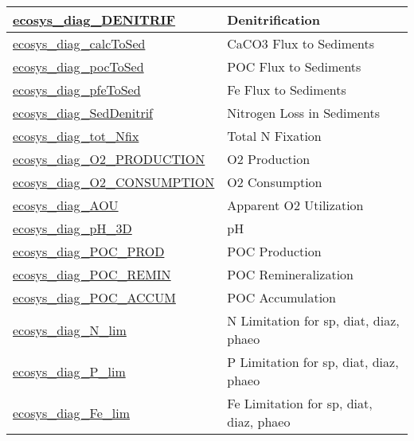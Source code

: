 {\begin{center}
\begin{longtable}{| p{2.0in} | p{4.0in} |}
    \hline
    \hyperref[subsec:var_sec_forcing_ecosys_diag_DENITRIF]{ecosys\_diag\_DENITRIF} & Denitrification \\
    \hline
    \hyperref[subsec:var_sec_forcing_ecosys_diag_calcToSed]{ecosys\_diag\_calcToSed} & CaCO3 Flux to Sediments \\
    \hline
    \hyperref[subsec:var_sec_forcing_ecosys_diag_pocToSed]{ecosys\_diag\_pocToSed} & POC Flux to Sediments \\
    \hline
    \hyperref[subsec:var_sec_forcing_ecosys_diag_pfeToSed]{ecosys\_diag\_pfeToSed} & Fe Flux to Sediments \\
    \hline
    \hyperref[subsec:var_sec_forcing_ecosys_diag_SedDenitrif]{ecosys\_diag\_SedDenitrif} & Nitrogen Loss in Sediments \\
    \hline
    \hyperref[subsec:var_sec_forcing_ecosys_diag_tot_Nfix]{ecosys\_diag\_tot\_Nfix} & Total N Fixation \\
    \hline
    \hyperref[subsec:var_sec_forcing_ecosys_diag_O2_PRODUCTION]{ecosys\_diag\_O2\_\-PRODUCTION} & O2 Production \\
    \hline
    \hyperref[subsec:var_sec_forcing_ecosys_diag_O2_CONSUMPTION]{ecosys\_diag\_O2\_\-CONSUMPTION} & O2 Consumption \\
    \hline
    \hyperref[subsec:var_sec_forcing_ecosys_diag_AOU]{ecosys\_diag\_AOU} & Apparent O2 Utilization \\
    \hline
    \hyperref[subsec:var_sec_forcing_ecosys_diag_pH_3D]{ecosys\_diag\_pH\_3D} & pH \\
    \hline
    \hyperref[subsec:var_sec_forcing_ecosys_diag_POC_PROD]{ecosys\_diag\_POC\_PROD} & POC Production \\
    \hline
    \hyperref[subsec:var_sec_forcing_ecosys_diag_POC_REMIN]{ecosys\_diag\_POC\_REMIN} & POC Remineralization \\
    \hline
    \hyperref[subsec:var_sec_forcing_ecosys_diag_POC_ACCUM]{ecosys\_diag\_POC\_ACCUM} & POC Accumulation \\
    \hline
    \hyperref[subsec:var_sec_forcing_ecosys_diag_N_lim]{ecosys\_diag\_N\_lim} & N Limitation for sp, diat, diaz, phaeo \\
    \hline
    \hyperref[subsec:var_sec_forcing_ecosys_diag_P_lim]{ecosys\_diag\_P\_lim} & P Limitation for sp, diat, diaz, phaeo \\
    \hline
    \hyperref[subsec:var_sec_forcing_ecosys_diag_Fe_lim]{ecosys\_diag\_Fe\_lim} & Fe Limitation for sp, diat, diaz, phaeo \\
    \hline

\end{longtable}
\end{center}}
